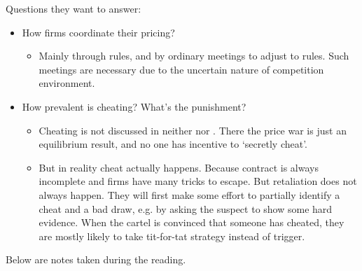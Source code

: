 \documentclass{book}
\theoremstyle{plain}
\theoremstyle{definition}
\begin{document}
Questions they want to answer:
\begin{itemize}
	\item How firms coordinate their pricing?
	\begin{itemize}
		\item Mainly through rules, and by ordinary meetings to adjust to rules. Such meetings are necessary due to the uncertain nature of competition environment.
	\end{itemize}
	\item How prevalent is cheating? What's the punishment?
	\begin{itemize}
		\item Cheating is not discussed in neither \cite{Green_Porter:1984EMCA} nor \cite{RotembergSaloner:86aer}. There the price war is just an equilibrium result, and no one has incentive to `secretly cheat'.
		\item But in reality cheat actually happens. Because contract is always incomplete and firms have many tricks to escape. But retaliation does not always happen. They will first make some effort to partially identify a cheat and a bad draw, e.g. by asking the suspect to show some hard evidence. When the cartel is convinced that someone has cheated, they are mostly likely to take tit-for-tat strategy instead of trigger.
	\end{itemize}
\end{itemize}

Below are notes taken during the reading.
\end{document}
